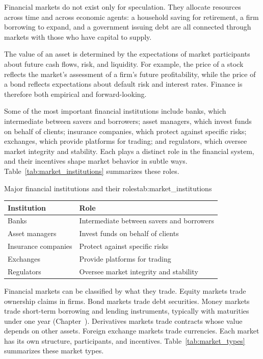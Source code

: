 \documentclass[../ai_in_finance]{subfiles}
\begin{document}
Financial markets do not exist only for speculation. They allocate resources across time and across economic agents: a household saving for retirement, a firm borrowing to expand, and a government issuing debt are all connected through markets with those who have capital to supply.

The value of an asset is determined by the expectations of market participants about future cash flows, risk, and liquidity. For example, the price of a stock reflects the market's assessment of a firm's future profitability, while the price of a bond reflects expectations about default risk and interest rates. Finance is therefore both empirical and forward-looking.

Some of the most important financial institutions include banks, which intermediate between savers and borrowers; asset managers, which invest funds on behalf of clients; insurance companies, which protect against specific risks; exchanges, which provide platforms for trading; and regulators, which oversee market integrity and stability. Each plays a distinct role in the financial system, and their incentives shape market behavior in subtle ways. Table~\ref{tab:market_institutions} summarizes these roles.

\begin{booktable}[htbp]{Major financial institutions and their roles}{tab:market_institutions}
\begin{tabular}{L{4.0cm}L{8.0cm}}
\toprule
Institution & Role \\
\midrule
Banks & Intermediate between savers and borrowers \\
Asset managers & Invest funds on behalf of clients \\
Insurance companies & Protect against specific risks \\
Exchanges & Provide platforms for trading \\
Regulators & Oversee market integrity and stability \\
\bottomrule
\end{tabular}
\end{booktable}

Financial markets can be classified by what they trade. Equity markets trade ownership claims in firms. Bond markets trade debt securities. Money markets trade short-term borrowing and lending instruments, typically with maturities under one year (Chapter~). Derivatives markets trade contracts whose value depends on other assets. Foreign exchange markets trade currencies. Each market has its own structure, participants, and incentives. Table~\ref{tab:market_types} summarizes these market types.
\end{document}
